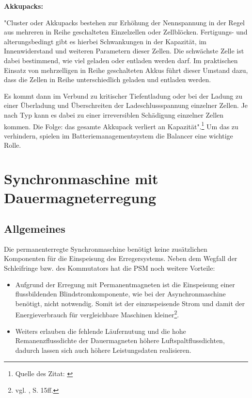 \textbf{Akkupacks:}

"Cluster oder Akkupacks bestehen zur Erhöhung der Nennspannung in der Regel aus mehreren in Reihe geschalteten Einzelzellen oder Zellblöcken. Fertigungs- und alterungsbedingt gibt es hierbei Schwankungen in der Kapazität, im Innenwiderstand und weiteren Parametern dieser Zellen. Die schwächste Zelle ist dabei bestimmend, wie viel geladen oder entladen werden darf. Im praktischen Einsatz von mehrzelligen in Reihe geschalteten Akkus führt dieser Umstand dazu, dass die Zellen in Reihe unterschiedlich geladen und entladen werden.

Es kommt dann im Verbund zu kritischer Tiefentladung oder bei der Ladung zu einer Überladung und Überschreiten der Ladeschlussspannung einzelner Zellen. Je nach Typ kann es dabei zu einer irreversiblen Schädigung einzelner Zellen kommen. Die Folge: das gesamte Akkupack verliert an Kapazität".\footnote{Quelle des Zitat: \cite{BalancingderPacks}}
Um das zu verhindern, spielen im Batteriemanagementsystem die Balancer eine wichtige Rolle.

\newpage


\section{Synchronmaschine mit Dauermagneterregung}
\subsection{Allgemeines}
Die permanenterregte Synchronmaschine benötigt keine zusätzlichen Komponenten für die Einspeisung des Erregersystems. Neben dem Wegfall der Schleifringe bzw. des Kommutators hat die PSM noch weitere Vorteile:
\\[5mm]
\begin{itemize}
	\item Aufgrund der Erregung mit Permanentmagneten ist die Einspeisung einer flussbildenden Blindstromkomponente, wie bei der Asynchronmaschine benötigt, nicht notwendig. Somit ist der einzuspeisende Strom und damit der Energieverbrauch für vergleichbare Maschinen kleiner\footnote{vgl. \cite{Dissertation}, S. 15ff.}. \\[3mm]
	\item Weiters erlauben die fehlende Läufernutung und die hohe Remanenzflussdichte der Dauermagneten höhere Luftspaltflussdichten, dadurch lassen sich auch höhere Leistungsdaten realisieren. \\[3mm]
\end{itemize}

